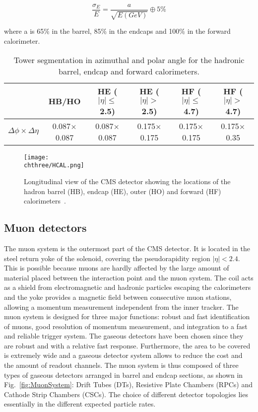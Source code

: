 \begin{equation}
\frac{\sigma_E}{E} = \frac{a}{\sqrt{E(GeV)}} \oplus 5\%
\end{equation}

where a is 65\% in the barrel, 85\% in the endcaps and 100\% in the forward calorimeter.

\begin{table}[!htb]
\centering
\caption{Tower segmentation in azimuthal and polar angle for the hadronic barrel, endcap and forward calorimeters.}
\begin{tabular}{c|c|c|c|c|c}
                                              & HB/HO                      & HE ($|\eta|\leq$2.5) & HE ($|\eta|>$2.5)     & HF ($|\eta|\leq$4.7) & HF ($|\eta|>$4.7) \\ \hline\hline
$\Delta\phi\times\Delta\eta$  & 0.087$\times$0.087 & 0.087$\times$0.087 & 0.175$\times$0.175 & 0.175$\times$0.175 & 0.175$\times$0.35
\end{tabular}
\label{tab:hcal}
\end{table}

\begin{figure}[!htb]
 \begin{center}
  \texttt{[image: \\chthree/HCAL.png]}
 \end{center}
 \caption{Longitudinal view of the CMS detector showing the locations of the hadron barrel (HB), endcap (HE), outer (HO) and forward (HF) calorimeters~\cite{Chatrchyan:2008zzk}.}
 \label{fig:HCALLayout}
\end{figure}

\subsection{Muon detectors}\label{subsec:muonchambers}

The muon system is the outermost part of the CMS detector. It is located in the steel return yoke of the solenoid, covering the pseudorapidity region $|\eta| < 2.4$. This is possible because muons are hardly affected by the large amount of material placed between the interaction point and the muon system. The coil acts as a shield from electromagnetic and hadronic particles escaping the calorimeters and the yoke provides a magnetic field between consecutive muon stations, allowing a momentum measurement independent from the inner tracker. The muon system is designed for three major functions: robust and fast identification of muons, good resolution of momentum measurement, and integration to a fast and reliable trigger system. The gaseous detectors have been chosen since they are robust and with a relative fast response. Furthermore, the area to be covered is extremely wide and a gaseous detector system allows to reduce the cost and the amount of readout channels. The muon system is thus composed of three types of gaseous detectors arranged in barrel and endcap sections, as shown in Fig.~\ref{fig:MuonSystem}: Drift Tubes (DTs), Resistive Plate Chambers (RPCs) and Cathode Strip Chambers (CSCs). The choice of different detector topologies lies essentially in the different expected particle rates. 

